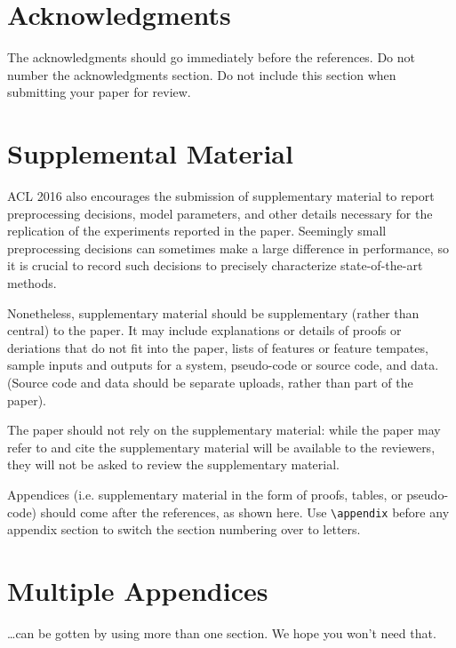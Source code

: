 \documentclass[11pt]{article}
\begin{document}
\section*{Acknowledgments}

The acknowledgments should go immediately before the references.  Do
not number the acknowledgments section. Do not include this section
when submitting your paper for review.

%
%



\appendix

\section{Supplemental Material}
\label{sec:supplemental}
ACL 2016 also encourages the submission of supplementary material
to report preprocessing decisions, model parameters, and other details
necessary for the replication of the experiments reported in the 
paper. Seemingly small preprocessing decisions can sometimes make
a large difference in performance, so it is crucial to record such
decisions to precisely characterize state-of-the-art methods.

Nonetheless, supplementary material should be supplementary (rather
than central) to the paper. It may include explanations or details
of proofs or deriations that do not fit into the paper, lists of
features or feature tempates, sample inputs and outputs for a system,
pseudo-code or source code, and data. (Source code and data should
be separate uploads, rather than part of the paper).

The paper should not rely on the supplementary material: while the paper
may refer to and cite the supplementary material will be available to the
reviewers, they will not be asked to review the
supplementary material.

Appendices (i.e. supplementary material in the form of proofs, tables,
or pseudo-code) should come after the references, as shown here. Use
\verb|\appendix| before any appendix section to switch the section
numbering over to letters.

\section{Multiple Appendices}
\dots can be gotten by using more than one section. We hope you won't
need that.
\end{document}
